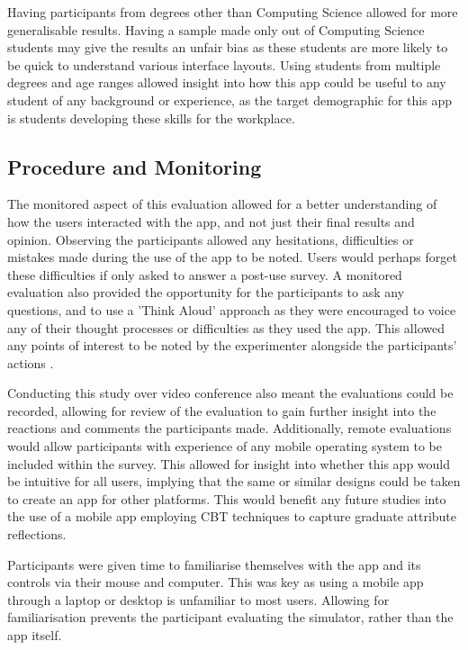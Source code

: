 \documentclass{l4proj}
\begin{document}
Having participants from degrees other than Computing Science allowed for more generalisable results. Having a sample made only out of Computing Science students may give the results an unfair bias as these students are more likely to be quick to understand various interface layouts. Using students from multiple degrees and age ranges allowed insight into how this app could be useful to any student of any background or experience, as the target demographic for this app is students developing these skills for the workplace.

\subsection{Procedure and Monitoring}

The monitored aspect of this evaluation allowed for a better understanding of how the users interacted with the app, and not just their final results and opinion. Observing the participants allowed any hesitations, difficulties or mistakes made during the use of the app to be noted. Users would perhaps forget these difficulties if only asked to answer a post-use survey. A monitored evaluation also provided the opportunity for the participants to ask any questions, and to use a 'Think Aloud' approach as they were encouraged to voice any of their thought processes or difficulties as they used the app. This allowed any points of interest to be noted by the experimenter alongside the participants’ actions \citep{lewis_task-centered_1994}.

Conducting this study over video conference also meant the evaluations could be recorded, allowing for review of the evaluation to gain further insight into the reactions and comments the participants made. Additionally, remote evaluations would allow participants with experience of any mobile operating system to be included within the survey. This allowed for insight into whether this app would be intuitive for all users, implying that the same or similar designs could be taken to create an app for other platforms. This would benefit any future studies into the use of a mobile app employing CBT techniques to capture graduate attribute reflections. 
 
Participants were given time to familiarise themselves with the app and its controls via their mouse and computer. This was key as using a mobile app through a laptop or desktop is unfamiliar to most users. Allowing for familiarisation prevents the participant evaluating the simulator, rather than the app itself. 
 
\end{document}

